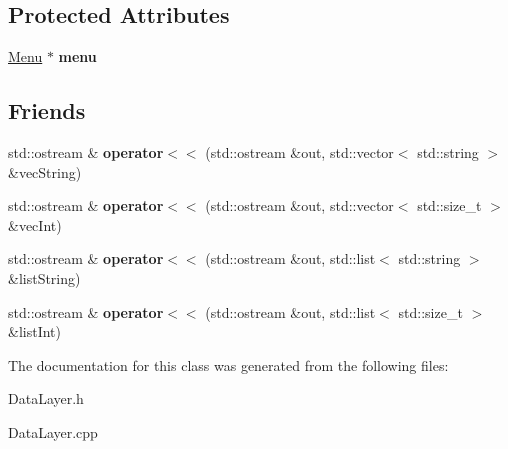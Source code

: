 \subsection*{Protected Attributes}
\begin{DoxyCompactItemize}
\item 
\hypertarget{classdata_layer_a761d663f6a0979d9792b799713f5e3bf}{}\hyperlink{class_menu}{Menu} $\ast$ {\bfseries menu}\label{classdata_layer_a761d663f6a0979d9792b799713f5e3bf}

\end{DoxyCompactItemize}
\subsection*{Friends}
\begin{DoxyCompactItemize}
\item 
\hypertarget{classdata_layer_afe77e05dc6854c055657315b56f65ca0}{}std\+::ostream \& {\bfseries operator$<$$<$} (std\+::ostream \&out, std\+::vector$<$ std\+::string $>$ \&vec\+String)\label{classdata_layer_afe77e05dc6854c055657315b56f65ca0}

\item 
\hypertarget{classdata_layer_a6f6f94355da0d50c7a8ec69b9d4208d7}{}std\+::ostream \& {\bfseries operator$<$$<$} (std\+::ostream \&out, std\+::vector$<$ std\+::size\+\_\+t $>$ \&vec\+Int)\label{classdata_layer_a6f6f94355da0d50c7a8ec69b9d4208d7}

\item 
\hypertarget{classdata_layer_a68e491304adfecb6981d3749efab0fe2}{}std\+::ostream \& {\bfseries operator$<$$<$} (std\+::ostream \&out, std\+::list$<$ std\+::string $>$ \&list\+String)\label{classdata_layer_a68e491304adfecb6981d3749efab0fe2}

\item 
\hypertarget{classdata_layer_a51e4795782ce6ef6982b97afe4a8d604}{}std\+::ostream \& {\bfseries operator$<$$<$} (std\+::ostream \&out, std\+::list$<$ std\+::size\+\_\+t $>$ \&list\+Int)\label{classdata_layer_a51e4795782ce6ef6982b97afe4a8d604}

\end{DoxyCompactItemize}


The documentation for this class was generated from the following files\+:\begin{DoxyCompactItemize}
\item 
Data\+Layer.\+h\item 
Data\+Layer.\+cpp\end{DoxyCompactItemize}
